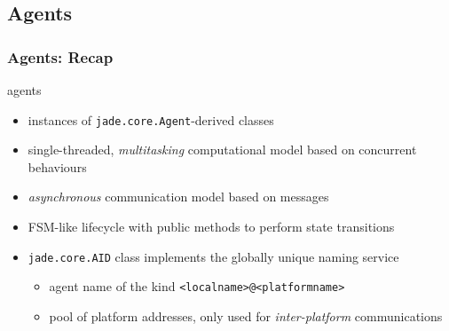 \documentclass{beamer}\mode<presentation>{\usetheme{AMSCesenaPurpleAndGold}}
\begin{document}

\subsection{\jade{} Agents}

\begin{frame}\frametitle{\jade{} Agents: Recap}
    \begin{block}{\jade{} agents}
        \begin{itemize}
            \item instances of \alert{\texttt{jade.core.Agent}}-derived classes
            \item \alert{single-threaded}, \emph{multitasking} computational model based on concurrent behaviours
            \item \emph{asynchronous} communication model based on \fipa{} \acl{} messages
            \item FSM-like lifecycle with public methods to perform state transitions
            \item \texttt{jade.core.AID} class implements the globally unique naming service
            \begin{itemize}
                \item agent name of the kind \texttt{<localname>@<platformname>}
                \item pool of platform addresses, only used for \emph{inter-platform} communications
            \end{itemize}
        \end{itemize}
    \end{block}
\end{frame}
\end{document}
